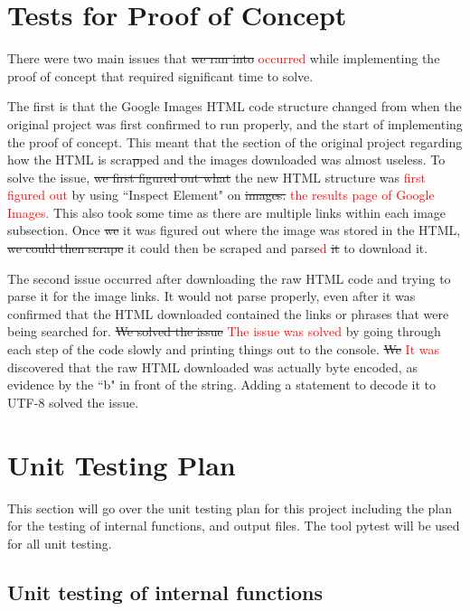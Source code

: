 \documentclass[12pt, titlepage]{article}
\begin{document}
\section{Tests for Proof of Concept}

There were two main issues that \sout{we ran into} \textcolor{red}{occurred} while implementing the proof of concept 
that required significant time to solve.

The first is that the Google Images HTML code structure changed from when the original project was first confirmed 
to run properly, and the start of implementing the proof of concept. This meant that the section of the original 
project regarding how the HTML is scra\sout{p}ped and the images downloaded was almost useless. To solve the issue, 
\sout{we first figured out what} the new HTML structure was \textcolor{red}{first figured out} by using 
``Inspect Element" on \sout{images.} \textcolor{red}{the results page of Google Images.} This also took some time as 
there are multiple links within each image subsection. Once \sout{we} it was figured out where the image was 
stored in the HTML, \sout{we could then scrape} it could then be scraped and parse\textcolor{red}{d} \sout{it} to download it.

The second issue occurred after downloading the raw HTML code and trying to parse it for the image links. 
It would not parse properly, even after it was confirmed that the HTML downloaded contained the links or phrases 
that were being searched for. \sout{We solved the issue} \textcolor{red}{The issue was solved} by going through 
each step of the code slowly and printing things out to the console. \sout{We} \textcolor{red}{It was} discovered that 
the raw HTML downloaded was actually byte encoded, as evidence by the ``b" in front of the string. 
Adding a statement to decode it to UTF-8 solved the issue.
	
\section{Unit Testing Plan}
\label{Unit Testing Plan}

This section will go over the unit testing plan for this project including the plan for the testing of internal functions, and output files. The tool pytest will be used for all unit testing.
		
\subsection{Unit testing of internal functions}
\end{document}
